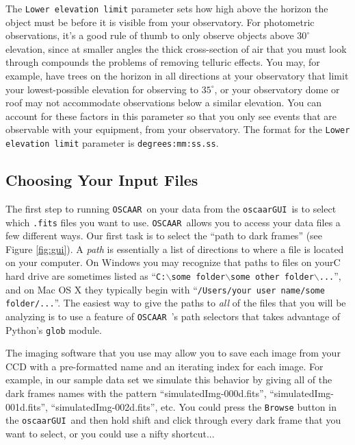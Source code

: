 \documentclass[a4paper]{article}
\newcommand{\code}[1]{\texttt{#1}}
\newcommand{\oscaar}{\code{OSCAAR}~}
\newcommand{\gui}{\code{oscaarGUI}~}
\begin{document}
The \code{Lower elevation limit} parameter sets how high above the horizon the object must be before it is visible from your observatory. For photometric observations, it's a good rule of thumb to only observe objects above $30^{\circ}$ elevation, since at smaller angles the thick cross-section of air that you must look through compounds the problems of removing telluric effects.  You may, for example, have trees on the horizon in all directions at your observatory that limit your lowest-possible elevation for observing to $35^{\circ}$, or your observatory dome or roof may not accommodate observations below a similar elevation. You can account for these factors in this parameter so that you only see events that are observable with your equipment, from your observatory. The format for the \code{Lower elevation limit} parameter is  \code{degrees:mm:ss.ss}.

\subsection{Choosing Your Input Files}
The first step to running \oscaar on your data from the \gui is to select which \code{.fits} files you want to use. \oscaar allows you to access your data files a few different ways. Our first task is to select the ``path to dark frames'' (see Figure \ref{fig:gui}). A \textit{path} is essentially a list of directions to where a file is located on your computer. On Windows you may recognize that paths to files on yourC hard drive are sometimes listed as ``\code{C:$\backslash$some folder$\backslash$some other folder$\backslash$...}'', and on Mac OS X they typically begin with ``\code{/Users/your user name/some folder/...}''. The easiest way to give the paths to \textit{all} of the files that you will be analyzing is to use a feature of \oscaar's path selectors that takes advantage of Python's \code{glob} module. 

The imaging software that you use may allow you to save each image from your CCD with a pre-formatted name and an iterating index for each image. For example, in our sample data set we simulate this behavior by giving all of the dark frames names with the pattern ``simulatedImg-000d.fits'', ``simulatedImg-001d.fits'', ``simulatedImg-002d.fits'', etc. You could press the \code{Browse} button in the \gui and then hold shift and click through every dark frame that you want to select, or you could use a nifty shortcut...
\end{document}
